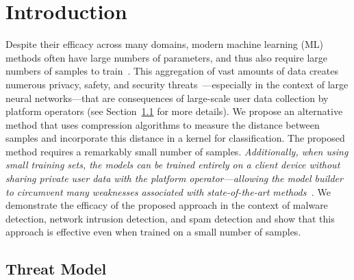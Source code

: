 \documentclass[preprint,12pt]{article}
\newcommand{\cm}[1]{\textit{{\color{blue}#1}}}
\begin{document}
\section{Introduction}

Despite their efficacy across many domains, modern machine learning (ML) methods often have large numbers of parameters, and thus also require large numbers of samples to train~\cite{desislavov2021compute}. 
This aggregation of vast amounts of data creates numerous privacy, safety, and security threats~\cite{chat_control}---especially in the context of large neural networks---that are consequences of large-scale user data collection by platform operators (see Section~\ref{threat} for more details).
We propose an alternative method that uses compression algorithms to measure the distance between samples and incorporate this distance in a kernel for classification. The proposed method requires a remarkably small number of samples.
\cm{Additionally, when using small training sets, the models can be trained entirely on a client device without sharing private user data with the platform operator---allowing the model builder to circumvent many weaknesses associated with state-of-the-art methods~\cite{chat_control,power_consumption_ai}.}
We demonstrate the efficacy of the proposed approach in the context of malware detection, network intrusion detection, and spam detection and show that this approach is effective even when trained on a small number of samples.





\subsection{Threat Model}
\label{threat}
\end{document}
